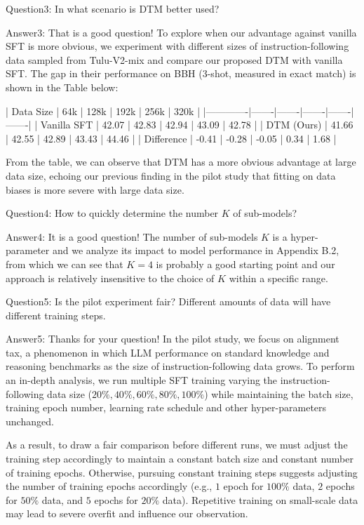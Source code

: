 Question3: In what scenario is DTM better used? 

Answer3: That is a good question! To explore when our advantage against vanilla SFT is more obvious, we experiment with different sizes of instruction-following data sampled from Tulu-V2-mix and compare our proposed DTM with vanilla SFT. The gap in their performance on BBH (3-shot, measured in exact match) is shown in the Table below:


|  Data Size  | 64k   | 128k  | 192k  | 256k  | 320k  |
|-------------|-------|-------|-------|-------|-------|
| Vanilla SFT | 42.07 | 42.83 | 42.94 | 43.09 | 42.78 |
| DTM (Ours)  | 41.66 | 42.55 | 42.89 | 43.43 | 44.46 |
| Difference  | -0.41 | -0.28 | -0.05 | 0.34  | 1.68  |

From the table, we can observe that DTM has a more obvious advantage at large data size, echoing our previous finding in the pilot study that fitting on data biases is more severe with large data size.

Question4: How to quickly determine the number $K$ of sub-models?

Answer4: It is a good question! The number of sub-models $K$ is a hyper-parameter and we analyze its impact to model performance in Appendix B.2, from which we can see that $K=4$ is probably a good starting point and our approach is relatively insensitive to the choice of $K$ within a specific range. 

Question5: Is the pilot experiment fair? Different amounts of data will have different training steps.   


Answer5: 
Thanks for your question! In the pilot study, we focus on alignment tax, a phenomenon in which LLM performance on standard knowledge and reasoning benchmarks as the size of instruction-following data grows. To perform an in-depth analysis,  we run multiple SFT training varying the instruction-following data size ($20\%, 40\%, 60\%, 80\%,  100\%$) while maintaining the batch size, training epoch number, learning rate schedule and other hyper-parameters unchanged. 

As a result, to draw a fair comparison before different runs, we must adjust the training step accordingly to maintain a constant batch size and constant number of training epochs. Otherwise, pursuing constant training steps suggests adjusting the number of training epochs accordingly (e.g., $1$ epoch for $100\%$ data, $2$ epochs for $50\%$ data, and $5$ epochs for $20\%$ data). Repetitive training on small-scale data may lead to severe overfit and influence our observation. 

